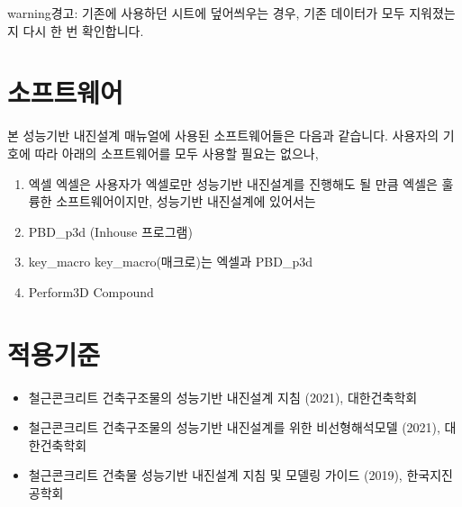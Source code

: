 \documentclass[a4paper,10pt,korean]{sphinxmanual}
\begin{document}
\begin{sphinxadmonition}{warning}{경고:}
\sphinxAtStartPar
기존에 사용하던 시트에 덮어씌우는 경우, 기존 데이터가 모두 지워졌는지 다시 한 번 확인합니다.
\end{sphinxadmonition}


\chapter{소프트웨어}
\label{\detokenize{pbd_p3d_manual:id3}}
\sphinxAtStartPar
본 성능기반 내진설계 매뉴얼에 사용된 소프트웨어들은 다음과 같습니다.
사용자의 기호에 따라 아래의 소프트웨어를 모두 사용할 필요는 없으나,
\begin{enumerate}
%
\item {} 
\sphinxAtStartPar
엑셀
엑셀은 사용자가
엑셀로만 성능기반 내진설계를 진행해도 될 만큼 엑셀은 훌륭한 소프트웨어이지만, 성능기반 내진설계에 있어서는

\item {} 
\sphinxAtStartPar
PBD\_p3d (In\sphinxhyphen{}house 프로그램)

\item {} 
\sphinxAtStartPar
key\_macro
key\_macro(매크로)는 엑셀과 PBD\_p3d

\item {} 
\sphinxAtStartPar
Perform\sphinxhyphen{}3D Compound

\end{enumerate}


\chapter{적용기준}
\label{\detokenize{pbd_p3d_manual:id4}}\begin{itemize}
\item {} 
\sphinxAtStartPar
철근콘크리트 건축구조물의 성능기반 내진설계 지침 (2021), 대한건축학회

\item {} 
\sphinxAtStartPar
철근콘크리트 건축구조물의 성능기반 내진설계를 위한 비선형해석모델 (2021), 대한건축학회

\item {} 
\sphinxAtStartPar
철근콘크리트 건축물 성능기반 내진설계 지침 및 모델링 가이드 (2019), 한국지진공학회

\end{itemize}



\renewcommand{\indexname}{색인}
\printindex
\end{document}
